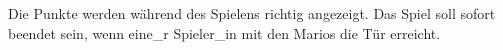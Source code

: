 Die Punkte werden während des Spielens richtig angezeigt. Das Spiel soll sofort beendet sein,
wenn eine\_r Spieler\_in mit den Marios die Tür erreicht.